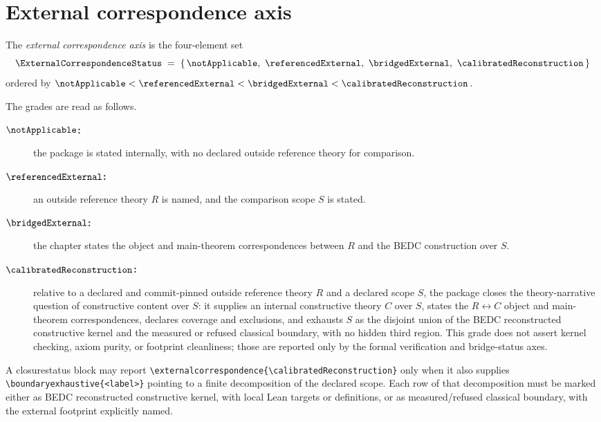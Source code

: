 \section{External correspondence axis}
\label{sec:external-correspondence-axis}

\begin{definition}
\label{def:external-correspondence-grades}
The \emph{external correspondence axis} is the four-element set
$$
  \ExternalCorrespondenceStatus
  \;=\;
  \{\, \notApplicable,\ \referencedExternal,\ \bridgedExternal,\ \calibratedReconstruction \,\}
$$
ordered by $\notApplicable < \referencedExternal < \bridgedExternal < \calibratedReconstruction$.
\end{definition}

\begin{definition}
\label{def:external-correspondence-interpretations}
The grades are read as follows.
\begin{description}
  \item[\textbf{$\notApplicable$:}] the package is stated internally, with no declared outside reference theory for comparison.
  \item[\textbf{$\referencedExternal$:}] an outside reference theory $R$ is named, and the comparison scope $S$ is stated.
  \item[\textbf{$\bridgedExternal$:}] the chapter states the object and main-theorem correspondences between $R$ and the BEDC construction over $S$.
  \item[\textbf{$\calibratedReconstruction$:}] relative to a declared and commit-pinned outside reference theory $R$ and a declared scope $S$, the package closes the theory-narrative question of constructive content over $S$: it supplies an internal constructive theory $C$ over $S$, states the $R \leftrightarrow C$ object and main-theorem correspondences, declares coverage and exclusions, and exhausts $S$ as the disjoint union of the BEDC reconstructed constructive kernel and the measured or refused classical boundary, with no hidden third region. This grade does not assert kernel checking, axiom purity, or footprint cleanliness; those are reported only by the formal verification and bridge-status axes.
\end{description}
\end{definition}

\begin{principle}
\label{prin:calibrated-reconstruction-boundary-exhaustion}
A closurestatus block may report \texttt{\textbackslash externalcorrespondence\{\textbackslash calibratedReconstruction\}} only when it also supplies \texttt{\textbackslash boundaryexhaustive\{<label>\}} pointing to a finite decomposition of the declared scope. Each row of that decomposition must be marked either as BEDC reconstructed constructive kernel, with local Lean targets or definitions, or as measured/refused classical boundary, with the external footprint explicitly named.
\end{principle}

